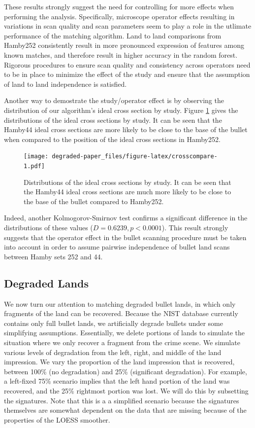 \documentclass[12pt,]{article}
\theoremstyle{definition}
\theoremstyle{definition}
\theoremstyle{definition}
\theoremstyle{remark}
\begin{document}
These results strongly suggest the need for controlling for more effects
when performing the analysis. Specifically, microscope operator effects
resulting in variations in scan quality and scan parameters seem to play
a role in the utlimate performance of the matching algorithm. Land to
land comparisons from Hamby252 consistently result in more pronounced
expression of features among known matches, and therefore result in
higher accuracy in the random forest. Rigorous procedures to ensure scan
quality and consistency across operators need to be in place to minimize
the effect of the study and ensure that the assumption of land to land
independence is satisfied.

Another way to demostrate the study/operator effect is by observing the
distribution of our algorithm's ideal cross section by study. Figure
\ref{fig:crosscompare} gives the distributions of the ideal cross
sections by study. It can be seen that the Hamby44 ideal cross sections
are more likely to be close to the base of the bullet when compared to
the position of the ideal cross sections in Hamby252.

\begin{figure}[htbp]
\centering
\texttt{[image: degraded-paper\_files/figure-latex/crosscompare-1.pdf]}
\caption{\label{fig:crosscompare}Distributions of the ideal cross sections
by study. It can be seen that the Hamby44 ideal cross sections are much
more likely to be close to the base of the bullet compared to Hamby252.}
\end{figure}

Indeed, another Kolmogorov-Smirnov test confirms a significant
difference in the distributions of these values
(\(D = 0.6239, p < 0.0001\)). This result strongly suggests that the
operator effect in the bullet scanning procedure must be taken into
account in order to assume pairwise independence of bullet land scans
between Hamby sets 252 and 44.

\subsection{Degraded Lands}\label{degraded-lands}

We now turn our attention to matching degraded bullet lands, in which
only fragments of the land can be recovered. Because the NIST database
currently contains only full bullet lands, we artificially degrade
bullets under some simplifying assumptions. Essentially, we delete
portions of lands to simulate the situation where we only recover a
fragment from the crime scene. We simulate various levels of degradation
from the left, right, and middle of the land impression. We vary the
proportion of the land impression that is recovered, between 100\% (no
degradation) and 25\% (significant degradation). For example, a
left-fixed 75\% scenario implies that the left hand portion of the land
was recovered, and the 25\% rightmost portion was lost. We will do this
by subsetting the signatures. Note that this is a a simplified scenario
because the signatures themselves are somewhat dependent on the data
that are missing because of the properties of the LOESS smoother.
\end{document}
